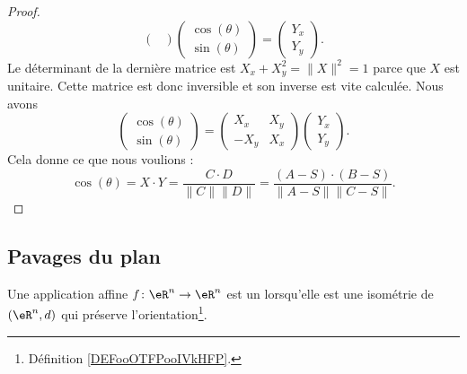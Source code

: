 \begin{proof}
\begin{equation}
\begin{pmatrix}
        \end{pmatrix}\begin{pmatrix}
            \cos(\theta)    \\ 
            \sin(\theta)    
        \end{pmatrix}=\begin{pmatrix}
            Y_x    \\ 
            Y_y    
        \end{pmatrix}.
    \end{equation}
    Le déterminant de la dernière matrice est \( X_x+X_y^2=\| X \|^2=1\) parce que \( X\) est unitaire. Cette matrice est donc inversible et son inverse est vite calculée. Nous avons
    \begin{equation}
        \begin{pmatrix}
            \cos(\theta)    \\ 
            \sin(\theta)    
        \end{pmatrix}=\begin{pmatrix}
            X_x    &   X_y    \\ 
            -X_y    &   X_x    
        \end{pmatrix}\begin{pmatrix}
            Y_x    \\ 
            Y_y    
        \end{pmatrix}.
    \end{equation}
    Cela donne ce que nous voulions :
    \begin{equation}
        \cos(\theta)=X\cdot Y=\frac{ C\cdot D }{ \| C \|\| D \| }=\frac{ (A-S)\cdot(B-S) }{ \| A-S \|\| C-S \| }.
    \end{equation}
\end{proof}

\subsection{Pavages du plan}

\begin{definition}      \label{DEFooHPKFooSIDhCM}
    Une application affine \( f\colon \eR^n\to \eR^n\) est un  lorsqu'elle est une isométrie de \( (\eR^n,d)\) qui préserve l'orientation\footnote{Définition \ref{DEFooOTFPooIVkHFP}.}.
\end{definition}

